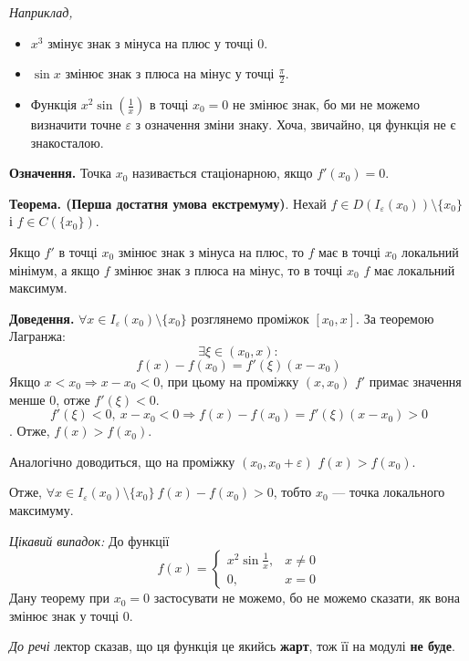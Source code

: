 \documentclass[12pt]{report}
\begin{document}
\vspace{3mm}

\textit{Наприклад,} 
\begin{itemize}
\item 
$x^3$ змінує знак з мінуса на плюс у точці $0$.  
\item 
$\sin x$ змінює знак з плюса на мінус у точці $\frac{\pi}{2}$.
\item
Функція $x^2 \sin (\frac{1}{x})$ в точці $x_0 = 0$ не змінює знак, бо ми не можемо визначити точне $\varepsilon$ з означення зміни знаку. Хоча, звичайно, ця функція не є знакосталою.
\end{itemize}

\vspace{2mm}

\textbf{Означення.} Точка $x_0$ називається стаціонарною, якщо $f'(x_0) = 0$.

\vspace{3mm}

\textbf{Теорема. (Перша достатня умова екстремуму)}.
Нехай $f \in D(I_{\varepsilon}(x_0))\setminus\{ x_0\}$ і $f \in C(\{ x_0\})$.

Якщо $f'$ в точці $x_0$ змінює знак з мінуса на плюс, то $f$ має в точці $x_0$ локальний мінімум, а якщо $f$ змінює знак з плюса на мінус, то в точці $x_0$ $f$ має локальний максимум.  

\textbf{Доведення.} $\forall x \in I_{\varepsilon}(x_0) \setminus \{ x_0\}$ розглянемо проміжок $[x_0, x]$. За теоремою Лагранжа:
$$\exists \xi \in (x_0, x):$$
$$f(x) - f(x_0) = f'(\xi) (x - x_0)$$
Якщо $x < x_0 \Longrightarrow x - x_0 < 0$, при цьому на проміжку $(x, x_0)$ $f'$ примає значення менше $0$, отже $f'(\xi) < 0$.
$$f'(\xi) < 0,\ x - x_0 < 0 \Longrightarrow f(x) - f(x_0) = f'(\xi) (x - x_0) > 0$$. Отже, $f(x) > f(x_0)$. 

Аналогічно доводиться, що на проміжку $(x_0, x_0 + \varepsilon)$ $f(x) > f(x_0)$.

Отже, $\forall x \in I_{\varepsilon}(x_0) \setminus \{x_0 \} \ f(x) - f(x_0) > 0$, тобто $x_0$ --- точка локального максимуму.

\textit{Цікавий випадок:}
До функції
$$f(x) = \begin{cases} x^2 \sin \frac{1}{x}, & x\neq 0 \\ 
						0, & x = 0\end{cases}$$
Дану теорему при $x_0 = 0$ застосувати не можемо, бо не можемо сказати, як вона змінює знак у точці $0$.

\textit{До речі} лектор сказав, що ця функція це якийсь \textbf{жарт}, тож її на модулі \textbf{не буде}.
\end{document}
